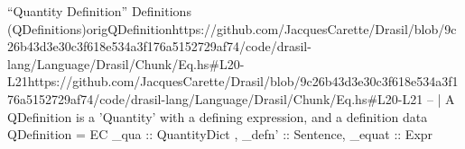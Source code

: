 \begin{haskell}{``Quantity Definition'' Definitions (QDefinitions)}{origQDefinition}{https://github.com/JacquesCarette/Drasil/blob/9c26b43d3e30c3f618e534a3f176a5152729a\newline{}f74/code/drasil-lang/Language/Drasil/Chunk/Eq.hs\#L20-L21}{https://github.com/JacquesCarette/Drasil/blob/9c26b43d3e30c3f618e534a3f176a5152729af74/code/drasil-lang/Language/Drasil/Chunk/Eq.hs\#L20-L21}
-- | A QDefinition is a 'Quantity' with a defining expression, and a definition
data QDefinition = EC { _qua :: QuantityDict , _defn' :: Sentence, _equat :: Expr }
\end{haskell}
